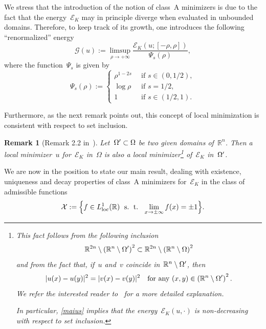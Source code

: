 \documentclass[10pt,a4paper]{amsart}
\newtheorem{rem}[theorem]{Remark}
\numberwithin{equation}{section}
\def\loc{\operatorname{\rm loc}}
\newcommand{\R}{\mathbb{R}}
\newcommand{\Ec}{\mathcal{E}_K}
\begin{document}
We stress that 
the introduction of the notion of
class~A minimizers is due to the fact that the energy~$\Ec$
may in principle diverge when evaluated in unbounded domains. Therefore, to keep track of its growth, one introduces the following
``renormalized'' energy
   \begin{equation}\label{G_star}
       \mathcal{G}(u):= \limsup_{\rho \to+ \infty }\frac{\Ec(u;[-\rho,\rho])}{\Psi_s(\rho)},
   \end{equation}
   where the function~$\Psi_s$ is given by
\begin{equation}\label{fnc_psi}
    \Psi_s(\rho):=
    \begin{cases}
        \rho^{1-2s} \, & \mbox{ if }  s \in (0,1/2),\\
        \log\rho \, & \mbox{ if }  s=1/2,\\
         1 \, & \mbox{ if } s \in (1/2,1).
    \end{cases}
   \end{equation}

Furthermore, as the next remark points out, this concept of local minimization is consistent with respect to set inclusion.  
\begin{rem}[Remark 2.2 in~\cite{CP16}]\label{remmarco}
{\rm
Let~$\Omega\rq{} \subset \Omega$ be two given domains of~$\R^n$. Then a local minimizer~$u$ for~$\Ec$ in~$\Omega$ is also a local minimizer\footnote{This fact
follows from the following inclusion
\begin{equation}\label{maius}
 \R^{2n} \setminus \left( \R^n \setminus \Omega\rq{}\right)^2 \subset \R^{2n} \setminus \left( \R^n \setminus \Omega \right)^2
\end{equation}
and from the fact that, if~$u$ and~$v$ coincide in~$\R^n\setminus \Omega\rq{}$, then
\[ |u(x)-u(y)|^2 = |v(x)-v(y)|^2 \quad\mbox{for any} \ (x,y) \in \left( \R^n \setminus \Omega\rq{} \right)^2. \]
We refer the interested reader to~\cite[Remark 1.2]{CozziValdNONLINEARITY} for a more detailed explanation.

In particular, \eqref{maius} implies that the energy~$\Ec(u,\cdot)$ is non-decreasing with respect to set inclusion.} of~$\Ec$ in~$\Omega\rq{}$.
}
\end{rem}  
  
We are now in the position to state our main result, dealing with existence, uniqueness and decay properties of class~A minimizers for~$\Ec$ in the class of admissible functions
  \begin{equation}\label{defmathcalixs00}
      \mathcal{X} := \Big\{f \in L^1_{\loc}(\R) \;{\mbox{ s. ~\!t. }}\;
      	\lim_{x\to  \pm \infty}f(x) =\pm 1 \Big\}.
  \end{equation}
\end{document}
